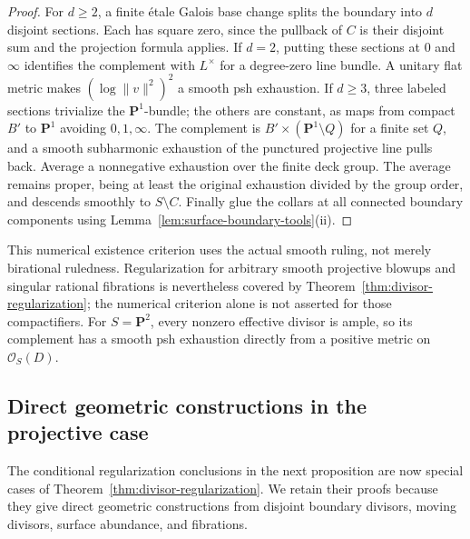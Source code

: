 \documentclass[11pt]{amsart}
\theoremstyle{definition}
\theoremstyle{remark}
\numberwithin{equation}{section}
\newcommand{\PP}{\mathbf P}
\newcommand{\OO}{\mathcal O}
\begin{document}
\begin{proof}
For $d\ge2$, a finite \'etale Galois base change splits the boundary
into $d$ disjoint sections. Each has square zero, since the pullback
of $C$ is their disjoint sum and the projection formula applies.
If $d=2$, putting these sections at $0$ and $\infty$ identifies the
complement with $L^\times$ for a degree-zero line bundle. A unitary
flat metric makes $(\log\|v\|^2)^2$ a smooth psh exhaustion.
If $d\ge3$, three labeled sections trivialize the $\PP^1$-bundle;
the others are constant, as maps from compact $B'$ to $\PP^1$
avoiding $0,1,\infty$. The complement is
$B'\times(\PP^1\setminus Q)$ for a finite set $Q$, and a smooth
subharmonic exhaustion of the punctured projective line pulls back.
Average a nonnegative exhaustion over the finite deck group. The
average remains proper, being at least the original exhaustion divided
by the group order, and descends smoothly to $S\setminus C$.
Finally glue the collars at all connected boundary components using
Lemma~\ref{lem:surface-boundary-tools}\textup{(ii)}.
\end{proof}

This numerical existence criterion uses the actual smooth ruling,
not merely birational ruledness. Regularization for arbitrary smooth
projective blowups and singular rational fibrations is nevertheless
covered by Theorem~\ref{thm:divisor-regularization}; the numerical
criterion alone is not asserted for those compactifiers. For $S=\PP^2$,
every nonzero effective divisor is ample, so its complement has a
smooth psh exhaustion directly from a positive metric on $\OO_S(D)$.

\subsection{Direct geometric constructions in the projective case}
\label{subsec:projective-cases}

The conditional regularization conclusions in the next proposition
are now special cases of Theorem~\ref{thm:divisor-regularization}.
We retain their proofs because they give direct geometric
constructions from disjoint boundary divisors, moving divisors,
surface abundance, and fibrations.
\end{document}
